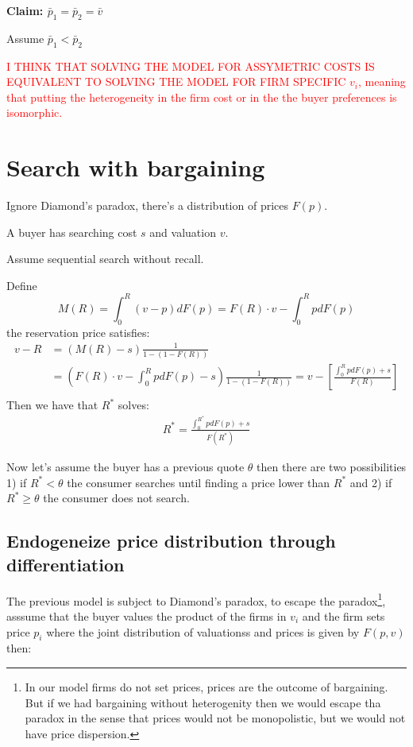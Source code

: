 \documentclass[12pt]{article}
\theoremstyle{plain}
\theoremstyle{plain}
\begin{document}
\vspace{2cm}

\textbf{Claim: $\bar{p}_1 =\bar{p}_2 =\bar{v}$ } 

Assume $\bar{p}_1 < \bar{p}_2$

\textcolor{red}{I THINK THAT SOLVING THE MODEL FOR ASSYMETRIC COSTS IS EQUIVALENT TO SOLVING THE MODEL FOR FIRM SPECIFIC $v_i$, meaning that putting the heterogeneity in the firm cost or in the the buyer preferences is isomorphic. }


\newpage 

\section{Search with bargaining}

Ignore Diamond's paradox, there's a distribution of prices $F(p)$. 

A buyer has searching cost $s$ and valuation $v$. 

Assume sequential search without recall. 

Define
$$M(R) = \int_0^R (v-p)dF(p) = F(R)\cdot v - \int_0^R pdF(p)$$ 
the reservation price satisfies: 
\begin{align*}
        v-R &= (M(R)-s)\frac{1}{1-(1-F(R))} \\
   &= \left(F(R)\cdot v - \int_0^R pdF(p)-s\right)\frac{1}{1-(1-F(R))} = v - \left[\frac{\int_0^R pdF(p)+s}{F(R)}\right]\\
\end{align*}
Then we have that $R^*$ solves: 
\begin{align}
        R^* = \frac{\int_0^{R^*} pdF(p)+s}{F(R^*)}
\end{align}

Now let's assume the buyer has a previous quote $\theta$ then there are two possibilities 1) if $ R^*< \theta $ the consumer searches until finding a price lower than $R^*$ and 2) if $R^*\geq \theta$ the consumer does not search.


\subsection{Endogeneize price distribution through differentiation}

The previous model is subject to Diamond's paradox, to escape the paradox\footnote{In our model firms do not set prices, prices are the outcome of bargaining. But if we had bargaining without heterogenity then we would escape tha paradox in the sense that prices would not be monopolistic, but we would not have price dispersion. }, asssume that the buyer values the product of the firms in $v_i$ and the firm sets price $p_i$ where the joint distribution of valuationss and prices is given by $F(p,v)$ then: 
\end{document}
